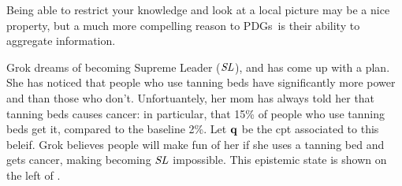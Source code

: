 \documentclass{article}
\newcommand{\MN}{PDG}
\newcommand{\MNs}{\MN s}
\numberwithin{equation}{section}
\begin{document}
	Being able to restrict your knowledge and look at a local picture may be a nice property, but a much more compelling reason to \MNs\ is their ability to aggregate information.
	
	\begin{example}\label{ex:grok-union}
		Grok dreams of becoming Supreme Leader ($\it SL$), and has come up with a plan. She has noticed that people who use tanning beds have significantly more power and than those who don't. Unfortuantely, her mom has always told her that tanning beds causes cancer: in particular, that 15\% of people who use tanning beds get it, compared to the baseline 2\%. Let $\mathbf q$ be the cpt associated to this beleif. 
		Grok believes people will make fun of her if she uses a tanning bed and gets cancer, making becoming $\it SL$ impossible. This epistemic state is shown on the left of .
		
		\begin{figure}
			\centering
\end{figure}
\end{example}
\end{document}

